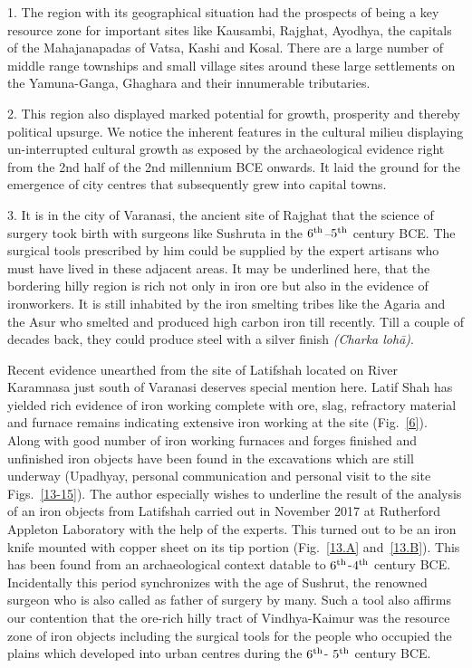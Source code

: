 1. The region with its geographical situation had the prospects of being a key resource zone for important sites like Kausambi, Rajghat, Ayodhya, the capitals of the Mahajanapadas of Vatsa, Kashi and Kosal. There are a large number of middle range townships and small village sites around these large settlements on the Yamuna-Ganga, Ghaghara and their innumerable tributaries.

2. This region also displayed marked potential for growth, prosperity and thereby political upsurge. We notice the inherent features in the cultural milieu displaying un-interrupted cultural growth as exposed by the archaeological evidence right from the 2nd half of the 2nd millennium BCE onwards. It laid the ground for the emergence of city centres that subsequently grew into capital towns.

3. It is in the city of Varanasi, the ancient site of Rajghat that the science of surgery took birth with surgeons like Sushruta in the $6^{\rm th}$–$5^{\rm th}$ century BCE. The surgical tools prescribed by him could be supplied by the expert artisans who must have lived in these adjacent areas. It may be underlined here, that the bordering hilly region is rich not only in iron ore but also in the evidence of ironworkers. It is still inhabited by the iron smelting tribes like the Agaria and the Asur who smelted and produced high carbon iron till recently. Till a couple of decades back, they could produce steel with a silver finish \textit{(Charka lohā)}.

Recent evidence unearthed from the site of Latifshah located on River Karamnasa just south of Varanasi deserves special mention here. Latif Shah has yielded rich evidence of iron working complete with ore, slag, refractory material and furnace remains indicating extensive iron working at the site (Fig.~\ref{6}). Along with good number of iron working furnaces and forges finished and unfinished iron objects have been found in the excavations which are still underway (Upadhyay, personal communication and personal visit to the site Figs.~\ref{13-15}). The author especially wishes to underline the result of the analysis of an iron objects from Latifshah carried out in November 2017 at Rutherford Appleton Laboratory with the help of the experts. This turned out to be an iron knife mounted with copper sheet on its tip portion (Fig.~\ref{13.A} and~\ref{13.B}). This has been found from an archaeological context datable to $6^{\rm th}$-$4^{\rm th}$ century BCE. Incidentally this period synchronizes with the age of Sushrut, the renowned surgeon who is also called as father of surgery by many. Such a tool also affirms our contention that the ore-rich hilly tract of Vindhya-Kaimur was the resource zone of iron objects including the surgical tools for the people who occupied the plains which developed into urban centres during the $6^{\rm th}$- $5^{\rm th}$ century BCE.

